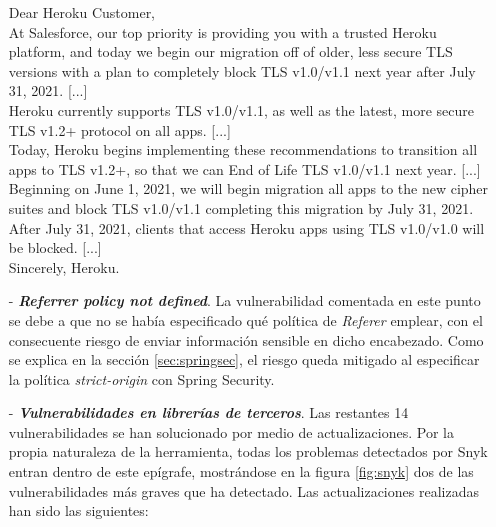 \documentclass[a4paper,12pt,twoside,openright]{report}
\begin{document}
\begin{itemize}
		\begin{displayquote}
			Dear Heroku Customer,
			\\
			
			At Salesforce, our top priority is providing you with a trusted Heroku platform, and today we begin our migration off of older, less secure TLS versions with a plan to completely block TLS v1.0/v1.1 next year after July 31, 2021. [...]
			\\
			
			Heroku currently supports TLS v1.0/v1.1, as well as the latest, more secure TLS v1.2+ protocol on all apps. [...]
			\\
			
			Today, Heroku begins implementing these recommendations to transition all apps to TLS v1.2+, so that we can End of Life TLS v1.0/v1.1 next year. [...]
			\\
			
			Beginning on June 1, 2021, we will begin migration all apps to the new cipher suites and block TLS v1.0/v1.1 completing this migration by July 31, 2021. 
			\\
			
			After July 31, 2021, clients that access Heroku apps using TLS v1.0/v1.0 will be blocked. [...]
			\\
			
			Sincerely, Heroku.
		\end{displayquote}
		
		\item[-] \textbf{\emph{Referrer policy not defined}}. La vulnerabilidad comentada en este punto se debe a que no se había especificado qué política de \emph{Referer} emplear, con el consecuente riesgo de enviar información sensible en dicho encabezado. Como se explica en la sección \ref{sec:springsec}, el riesgo queda mitigado al especificar la política \emph{strict-origin} con Spring Security.
		
		\item[-] \textbf{\emph{Vulnerabilidades en librerías de terceros}}. Las restantes 14 vulnerabilidades se han solucionado por medio de actualizaciones. Por la propia naturaleza de la herramienta, todas los problemas detectados por Snyk entran dentro de este epígrafe, mostrándose en la figura \ref{fig:snyk} dos de las vulnerabilidades más graves que ha detectado. Las actualizaciones realizadas han sido las siguientes:
		

\end{itemize}
\end{document}
